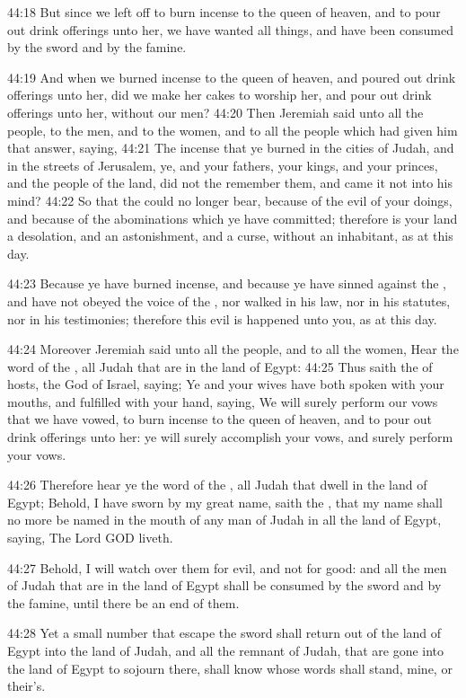 44:18 But since we left off to burn incense to the queen of heaven, and to pour out drink offerings unto her, we have wanted all things, and have been consumed by the sword and by the famine.

44:19 And when we burned incense to the queen of heaven, and poured out drink offerings unto her, did we make her cakes to worship her, and pour out drink offerings unto her, without our men?  44:20 Then Jeremiah said unto all the people, to the men, and to the women, and to all the people which had given him that answer, saying, 44:21 The incense that ye burned in the cities of Judah, and in the streets of Jerusalem, ye, and your fathers, your kings, and your princes, and the people of the land, did not the \LORD remember them, and came it not into his mind?  44:22 So that the \LORD could no longer bear, because of the evil of your doings, and because of the abominations which ye have committed; therefore is your land a desolation, and an astonishment, and a curse, without an inhabitant, as at this day.

44:23 Because ye have burned incense, and because ye have sinned against the \LORD, and have not obeyed the voice of the \LORD, nor walked in his law, nor in his statutes, nor in his testimonies; therefore this evil is happened unto you, as at this day.

44:24 Moreover Jeremiah said unto all the people, and to all the women, Hear the word of the \LORD, all Judah that are in the land of Egypt: 44:25 Thus saith the \LORD of hosts, the God of Israel, saying; Ye and your wives have both spoken with your mouths, and fulfilled with your hand, saying, We will surely perform our vows that we have vowed, to burn incense to the queen of heaven, and to pour out drink offerings unto her: ye will surely accomplish your vows, and surely perform your vows.

44:26 Therefore hear ye the word of the \LORD, all Judah that dwell in the land of Egypt; Behold, I have sworn by my great name, saith the \LORD, that my name shall no more be named in the mouth of any man of Judah in all the land of Egypt, saying, The Lord GOD liveth.

44:27 Behold, I will watch over them for evil, and not for good: and all the men of Judah that are in the land of Egypt shall be consumed by the sword and by the famine, until there be an end of them.

44:28 Yet a small number that escape the sword shall return out of the land of Egypt into the land of Judah, and all the remnant of Judah, that are gone into the land of Egypt to sojourn there, shall know whose words shall stand, mine, or their's.

